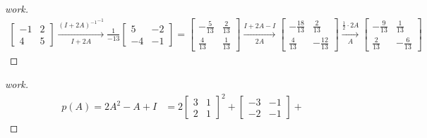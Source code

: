 \documentclass{article}
\begin{document}
\begin{question}{1.4}{}
  \begin{proof}[work]
    \begin{align*}
      \begin{bmatrix}
        -1 & 2 \\
        4  & 5
      \end{bmatrix} \xrightarrow[I + 2A]{{(I + 2A)^{-1}}^{-1}}
      \frac{1}{-13}
      \begin{bmatrix}
        5  & -2 \\
        -4 & -1
      \end{bmatrix} =
      \begin{bmatrix}
        -\frac{5}{13} & \frac{2}{13} \\
        \frac{4}{13}  & \frac{1}{13}
      \end{bmatrix} \xrightarrow[2A]{I + 2A - I}
      \begin{bmatrix}
        -\frac{18}{13} & \frac{2}{13}   \\
        \frac{4}{13}   & -\frac{12}{13}
      \end{bmatrix} \xrightarrow[A]{\frac{1}{2} \cdot 2A}
      \begin{bmatrix}
        -\frac{9}{13} & \frac{1}{13}  \\
        \frac{2}{13}  & -\frac{6}{13}
      \end{bmatrix}
    \end{align*}
  \end{proof}
  \begin{proof}[work]
    \begin{align*}
      p(A) = 2A^2 - A + I & = 2\begin{bmatrix}
                                 3 & 1 \\
                                 2 & 1
                               \end{bmatrix}^2 +
      \begin{bmatrix}
        -3 & -1 \\
        -2 & -1
      \end{bmatrix} +

\end{align*}
\end{proof}
\end{question}
\end{document}
